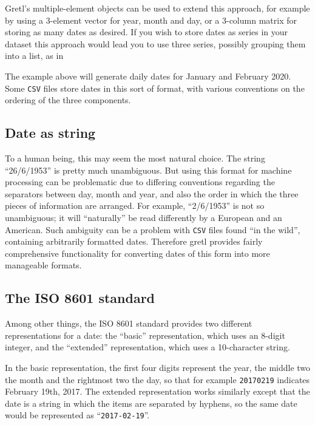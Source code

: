 Gretl's multiple-element objects can be used to extend this approach,
for example by using a 3-element vector for year, month and day, or a
3-column matrix for storing as many dates as desired. If you wish to
store dates as series in your dataset this approach would lead you to
use three series, possibly grouping them into a list, as in
The example above will generate daily dates for January and February
2020. Some \texttt{CSV} files store dates in this sort of format, with
various conventions on the ordering of the three components.

\subsection{Date as string}
\label{sec:cal-generic-string}

To a human being, this may seem the most natural choice.  The string
``26/6/1953'' is pretty much unambiguous. But using this format for
machine processing can be problematic due to differing conventions
regarding the separators between day, month and year, and also the
order in which the three pieces of information are arranged.  For
example, ``2/6/1953'' is not so unambiguous; it will ``naturally'' be
read differently by a European and an American. Such ambiguity can be
a problem with \texttt{CSV} files found ``in the wild'', containing
arbitrarily formatted dates. Therefore gretl provides fairly
comprehensive functionality for converting dates of this form into
more manageable formats.

\subsection{The ISO 8601 standard}
\label{sec:cal-ISO8601}

Among other things, the ISO 8601 standard provides two different
representations for a date: the ``basic'' representation, which uses
an 8-digit integer, and the ``extended'' representation, which uses a
10-character string.

In the basic representation, the first four digits represent the year,
the middle two the month and the rightmost two the day, so that for
example \texttt{20170219} indicates February 19th, 2017. The extended
representation works similarly except that the date is a string in
which the items are separated by hyphens, so the same date would be
represented as ``\texttt{2017-02-19}''.

